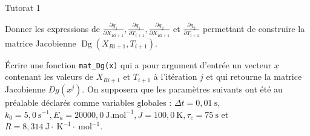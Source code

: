 \begin{exo}[PC][1][python]{Tutorat 1}
\begin{quest}
  \item Donner les expressions de \(\frac{\partial g_{1}}{\partial X_{R i+1}}, \frac{\partial g_{1}}{\partial T_{i+1}}, \frac{\partial g_{2}}{\partial X_{R i+1}}\) et \(\frac{\partial g_{2}}{\partial T_{i+1}}\) permettant de construire la matrice Jacobienne \(\operatorname{Dg}\left(X_{R i+1}, T_{i+1}\right)\).
  \item Écrire une fonction \texttt{mat\_Dg(x)} qui a pour argument d'entrée un vecteur \(x\) contenant les valeurs de \(X_{R i+1}\) et \(T_{i+1}\) à l'itération \(j\) et qui retourne la matrice Jacobienne \(D g\left(x^{j}\right)\). On supposera que les paramètres suivants ont été au préalable déclarés comme variables globales : \(\Delta t=0,01 \mathrm{~s}\), \(k_{0}=5,0 \mathrm{~s}^{-1}, E_{a}=20000,0 \mathrm{~J} . \mathrm{mol}^{-1}, J=100,0 \mathrm{~K}, \tau_{c}=75 \mathrm{~s}\) et \(R=8,314 \mathrm{~J} \cdot \mathrm{~K}^{-1} \cdot \mathrm{~mol}^{-1}\).
  

\end{quest}
\end{exo}
